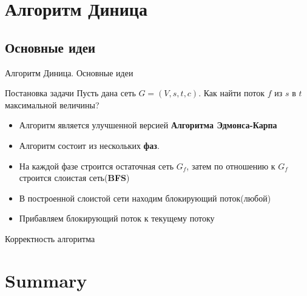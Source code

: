\documentclass{beamer}
\begin{document}
\section{Алгоритм Диница}

\subsection{Основные идеи}

\begin{frame}{Алгоритм Диница. Основные идеи}
    \begin{block}{Постановка задачи}
    Пусть дана сеть $G = (V, s, t, c)$. Как найти поток $f$ из $s$ в $t$ максимальной величины?
    \end{block}
    \begin{itemize}
        \item {
        Алгоритм является улучшенной версией \textbf{Алгоритма Эдмонса-Карпа}
        \pause
        }
        \item {
        Алгоритм состоит из нескольких \textbf{фаз}.
        \pause
        }
        \item {
        На каждой фазе строится остаточная сеть \textbf{$G_f$}, затем по отношению к $G_f$ строится слоистая сеть(\textbf{BFS})
        \pause
        }
        \item {
        В построенной слоистой сети находим блокирующий поток(любой)
        \pause
        }
        \item {
        Прибавляем блокирующий поток к текущему потоку
        }
    \end{itemize}
\end{frame}

\begin{frame}{Корректность алгоритма}

\end{frame}

\section*{Summary}
\end{document}
